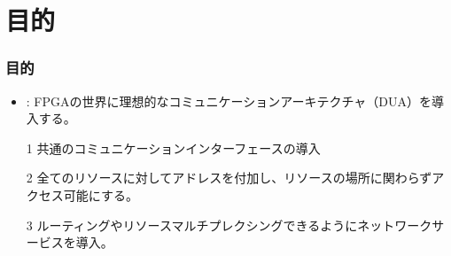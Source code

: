 \documentclass[dvipdfmx,9pt,notheorems]{beamer}
\theoremstyle{definition}
\begin{document}

\section{目的}
\begin{frame}\frametitle{目的}
	\begin{itemize}
		\item {} : FPGAの世界に理想的なコミュニケーションアーキテクチャ（DUA）を導入する。
		\item[1] 共通のコミュニケーションインターフェースの導入
		\item[2] 全てのリソースに対してアドレスを付加し、リソースの場所に関わらずアクセス可能にする。
		\item[3] ルーティングやリソースマルチプレクシングできるようにネットワークサービスを導入。
	\end{itemize}
	\pnote{
	}
\end{frame}


\end{document}
